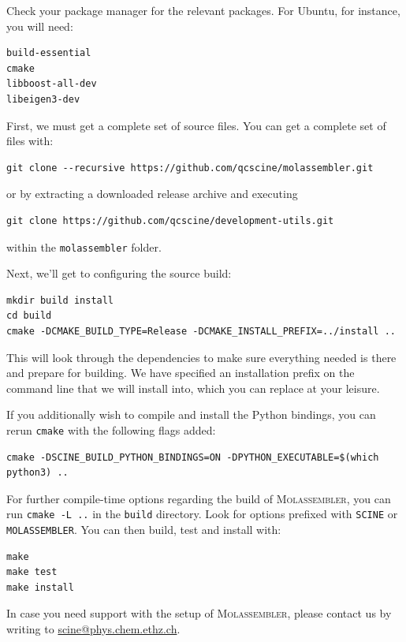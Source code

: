 \documentclass[]{tufte-book}
\begin{document}
Check your package manager for the relevant packages. For Ubuntu, for instance,
you will need:

\begin{Verbatim}
build-essential
cmake
libboost-all-dev
libeigen3-dev
\end{Verbatim}

First, we must get a complete set of source files. You can get a complete set of
files with:
\begin{Verbatim}
git clone --recursive https://github.com/qcscine/molassembler.git
\end{Verbatim} 
or by extracting a downloaded
release archive and executing 
\begin{Verbatim}
git clone https://github.com/qcscine/development-utils.git
\end{Verbatim}
within the \texttt{molassembler} folder.

Next, we'll get to configuring the source build:

\begin{Verbatim}
mkdir build install
cd build
cmake -DCMAKE_BUILD_TYPE=Release -DCMAKE_INSTALL_PREFIX=../install ..
\end{Verbatim}

This will look through the dependencies to make sure everything needed is there
and prepare for building. We have specified an installation prefix on the
command line that we will install into, which you can replace at your leisure.

If you additionally wish to compile and install the Python bindings, you can
rerun \texttt{cmake} with the following flags added:

\begin{Verbatim}
cmake -DSCINE_BUILD_PYTHON_BINDINGS=ON -DPYTHON_EXECUTABLE=$(which python3) ..
\end{Verbatim}

For further compile-time options regarding the build of \textsc{Molassembler},
you can run \texttt{cmake -L ..} in the \texttt{build} directory. Look for
options prefixed with \texttt{SCINE} or \texttt{MOLASSEMBLER}. You can then
build, test and install with:

\begin{Verbatim}
make
make test
make install
\end{Verbatim}

In case you need support with the setup of \textsc{Molassembler}, please contact
us by writing to \href{mailto:scine@phys.chem.ethz.ch}{scine@phys.chem.ethz.ch}.
\end{document}
